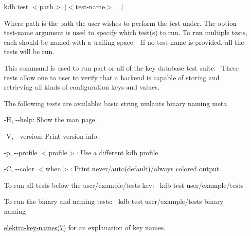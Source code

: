 {\ttfamily kdb test $<$path$>$ \mbox{[}$<$test-\/name$>$ ...\mbox{]}}~\newline


Where {\ttfamily path} is the path the user wishes to perform the test under. The option {\ttfamily test-\/name} argument is used to specify which test(s) to run. To run multiple tests, each should be named with a trailing space.~\newline
 If no {\ttfamily test-\/name} is provided, all the tests will be run.~\newline


This command is used to run part or all of the key database test suite.~\newline
 These tests allow one to user to verify that a backend is capable of storing and retrieving all kinds of configuration keys and values.~\newline


The following tests are available\+: basic string umlauts binary naming meta~\newline



\begin{DoxyItemize}
\item {\ttfamily -\/H}, {\ttfamily -\/-\/help}\+: Show the man page.
\item {\ttfamily -\/V}, {\ttfamily -\/-\/version}\+: Print version info.
\item {\ttfamily -\/p}, {\ttfamily -\/-\/profile $<$profile$>$}\+: Use a different kdb profile.
\item {\ttfamily -\/C}, {\ttfamily -\/-\/color $<$when$>$}\+: Print never/auto(default)/always colored output.
\end{DoxyItemize}

To run all tests below the {\ttfamily user/example/tests} key\+:~\newline
 {\ttfamily kdb test user/example/tests}~\newline


To run the {\ttfamily binary} and {\ttfamily naming} tests\+:~\newline
 {\ttfamily kdb test user/example/tests binary naming}~\newline



\begin{DoxyItemize}
\item \hyperlink{doc_help_elektra-key-names_md}{elektra-\/key-\/names(7)} for an explanation of key names. 
\end{DoxyItemize}